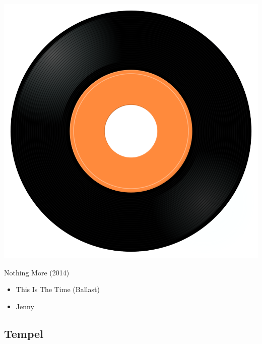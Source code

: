 \begin{minipage}[t]{0.25\textwidth}\vspace{0pt}
\captionsetup{type=figure}
\includegraphics[width=\textwidth]{Images/cover.png}
\caption*{Nothing More (2014)}
\end{minipage}
\begin{minipage}[t]{0.25\textwidth}\vspace{0pt}
\begin{itemize}[nosep,leftmargin=1em,labelwidth=*,align=left]
	\setlength{\itemsep}{0pt}
	\item This Is The Time (Ballast)
	\item Jenny	
\end{itemize}
\end{minipage}

\subsection{Tempel}

